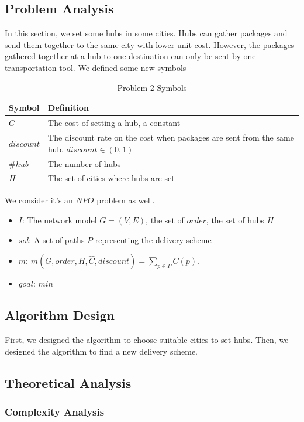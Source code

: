 \documentclass{llncs}
\begin{document}
\subsection{Problem Analysis}
In this section, we set some hubs in some cities. Hubs can gather packages and send them together to the same city with lower unit cost. However, the packages gathered together at a hub to one
destination can only be sent by one transportation tool. We defined some new symbols \\
\begin{table}
  \caption{Problem 2 Symbols}\label{sym2}
  \centering
  \begin{tabular}{|l|l|}
  \hline
  Symbol &  Definition \\
  \hline
  $\hat{C}$ & The cost of setting a hub, a constant\\
  \hline
  $discount$ & The discount rate on the cost when packages are sent from the same hub, $discount\in (0,1)$\\
  \hline
  $\#hub$ & The number of hubs \\
  \hline
  $H$ & The set of cities where hubs are set \\
  \hline
  \end{tabular}
\end{table}
We consider it's an $NPO$ problem as well.
\begin{itemize}
  \item $I$: The network model $G=(V,E)$, the set of $order$, the set of hubs $H$
  \item $sol$: A set of paths $P$ representing the delivery scheme
  \item $m$: $m(G,order,H,\hat{C},discount)=\sum_{p \in P}C(p)$.
  \item $goal$: $min$
\end{itemize}
\subsection{Algorithm Design}
First, we designed the algorithm to choose suitable cities to set hubs.
Then, we designed the algorithm to find a new delivery scheme.
\subsection{Theoretical Analysis}
\subsubsection{Complexity Analysis}
\end{document}
